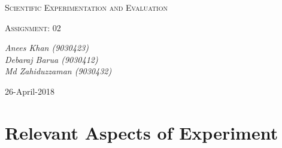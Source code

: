 \documentclass[10pt,a4paper]{article}
\begin{document}
	\begin{titlepage}
	\centering

		{\scshape\LARGE Scientific Experimentation and Evaluation\par}

		{\scshape\Large Assignment: 02\par}

		\vfill

		\vfill
		{\Large\itshape Anees Khan (9030423)
			\\Debaraj Barua (9030412)\\
			Md Zahiduzzaman (9030432)
			\par}
		\vfill

		{\large 26-April-2018\par}
	\end{titlepage}
	\tableofcontents
	\listoffigures	
	\listoftables
	\newpage
	\section{Relevant Aspects of Experiment}
\end{document}
